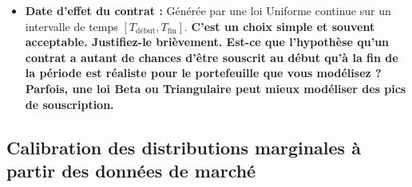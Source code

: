 \begin{itemize}
    \item \textbf{Date d'effet du contrat :} Générée par une loi Uniforme continue sur un intervalle de temps $[T_{\text{début}}, T_{\text{fin}}]$. \textbf{C'est un choix simple et souvent acceptable. Justifiez-le brièvement. Est-ce que l'hypothèse qu'un contrat a autant de chances d'être souscrit au début qu'à la fin de la période est réaliste pour le portefeuille que vous modélisez ? Parfois, une loi Beta ou Triangulaire peut mieux modéliser des pics de souscription.}
\end{itemize}

\subsection{Calibration des distributions marginales à partir des données de marché}

